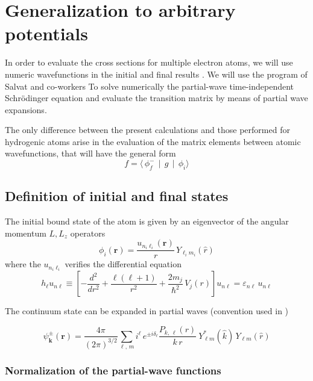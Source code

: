 \chapter{Generalization to arbitrary potentials}

In order to evaluate the cross sections for multiple electron atoms, we
will use numeric wavefunctions in the initial and final results
\parencite{Madison1973PRAp2449,Gulyas1995JPBp245,Fiori2001PRAp12705}. We will use the program of Salvat and co-workers \parencite{Salvat1995CPCp151} To solve numerically the partial-wave time-independent Schr\"{o}dinger equation and evaluate the transition matrix by means of partial wave expansions.

The only difference between the present calculations and those
performed for hydrogenic atoms arise in the evaluation of the matrix
elements between atomic wavefunctions, that will have the general form
\[
f = \langle \, \phi_{f}^{-} \, \mid  \, g \, \mid \, \phi_{i} \rangle
\]

\section{Definition of initial and final states}

The initial bound state of the atom is given by an eigenvector of the
angular momentum $L,L_{z}$ operators
%
\begin{equation}\label{Q:ap1}
\phi_{i}(\bm{r}) = \frac{u_{n_{i} \ell_{i}} (\bm{r})}{r} \, Y_{\ell_{i}
m_{i}}(\hat{r})
\end{equation}
%
where the $u_{n_{i} \ell_{i}}$ verifies the differential equation
\[
h_{\ell} u_{n \ell} \equiv \left[ - \frac{d^{2}}{d r^{2}} +
\frac{\ell (\ell + 1 )}{r^{2}} + \frac{2 m_{j}}{\hbar^{2}}\, V_{j}(r)
\right] u_{n \ell} = \varepsilon_{n \ell} \, u_{n \ell}
\]

The continuum state can be expanded in partial waves (convention used
in \cite{Salvat1995CPCp151})

\begin{equation}\label{Q:ap2}
\psi^{\pm}_{\bm{k}}(\bm{r}) = \frac{4 \pi}{(2 \pi)^{3/2}}\sum_{\ell,\, m}
i^{\ell} \, e^{\pm i \delta_{\ell}} \frac{P_{k,\,
\ell}(r)}{k\,r}\ Y^{*}_{\ell m}(\hat{k})\, Y_{\ell m}(\hat{r})
\end{equation}

\subsection{Normalization of the partial-wave functions}

